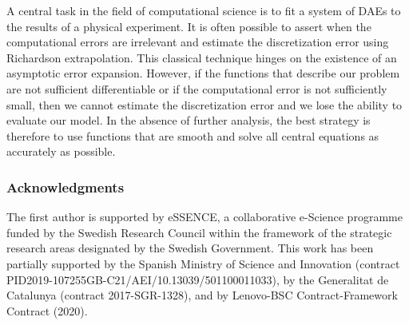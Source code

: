 \documentclass[runningheads]{llncs}
\begin{document}
A central task in the field of computational science is to fit a system of DAEs to the results of a physical experiment. It is often possible to assert when the computational errors are irrelevant and estimate the discretization error using Richardson extrapolation. This classical technique hinges on the existence of an asymptotic error expansion. However, if the functions that describe our problem are not sufficient differentiable or if the computational error is not sufficiently small, then we cannot estimate the discretization error and we lose the ability to evaluate our model. In the absence of further analysis, the best strategy is therefore to use functions that are smooth and solve all central equations as accurately as possible.

\subsubsection{Acknowledgments}

The first author is supported by eSSENCE, a collaborative e-Science programme funded by the Swedish Research Council within the framework of the strategic research areas designated by the Swedish Government.
This work has been partially supported by the Spanish Ministry of Science and Innovation (contract PID2019-107255GB-C21/AEI/10.13039/501100011033), by the Generalitat de Catalunya (contract 2017-SGR-1328), and by Lenovo-BSC Contract-Framework Contract (2020).

%
%
%


 
\end{document}
